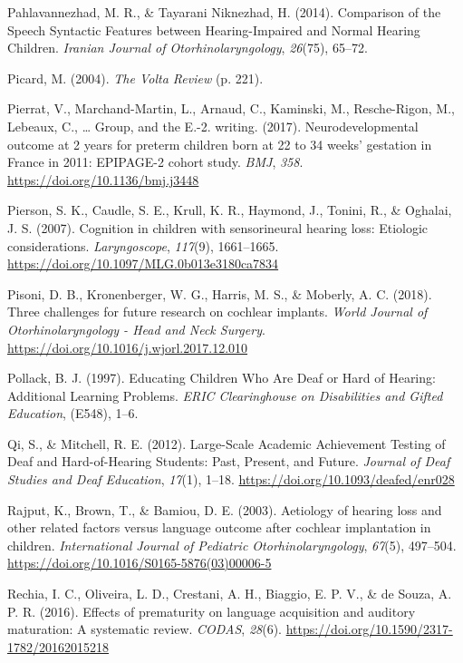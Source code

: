 \documentclass[english,man]{apa6}
\begin{document}
\leavevmode\hypertarget{ref-pahlavannezhad2014}{}%
Pahlavannezhad, M. R., \& Tayarani Niknezhad, H. (2014). Comparison of the Speech Syntactic Features between Hearing-Impaired and Normal Hearing Children. \emph{Iranian Journal of Otorhinolaryngology}, \emph{26}(75), 65--72.

\leavevmode\hypertarget{ref-picard2004}{}%
Picard, M. (2004). \emph{The Volta Review} (p. 221).

\leavevmode\hypertarget{ref-pierrat2017}{}%
Pierrat, V., Marchand-Martin, L., Arnaud, C., Kaminski, M., Resche-Rigon, M., Lebeaux, C., \ldots{} Group, and the E.-2. writing. (2017). Neurodevelopmental outcome at 2 years for preterm children born at 22 to 34 weeks' gestation in France in 2011: EPIPAGE-2 cohort study. \emph{BMJ}, \emph{358}. \url{https://doi.org/10.1136/bmj.j3448}

\leavevmode\hypertarget{ref-pierson2007}{}%
Pierson, S. K., Caudle, S. E., Krull, K. R., Haymond, J., Tonini, R., \& Oghalai, J. S. (2007). Cognition in children with sensorineural hearing loss: Etiologic considerations. \emph{Laryngoscope}, \emph{117}(9), 1661--1665. \url{https://doi.org/10.1097/MLG.0b013e3180ca7834}

\leavevmode\hypertarget{ref-pisoni2018}{}%
Pisoni, D. B., Kronenberger, W. G., Harris, M. S., \& Moberly, A. C. (2018). Three challenges for future research on cochlear implants. \emph{World Journal of Otorhinolaryngology - Head and Neck Surgery}. \url{https://doi.org/10.1016/j.wjorl.2017.12.010}

\leavevmode\hypertarget{ref-pollack1997}{}%
Pollack, B. J. (1997). Educating Children Who Are Deaf or Hard of Hearing: Additional Learning Problems. \emph{ERIC Clearinghouse on Disabilities and Gifted Education}, (E548), 1--6.

\leavevmode\hypertarget{ref-qi2012}{}%
Qi, S., \& Mitchell, R. E. (2012). Large-Scale Academic Achievement Testing of Deaf and Hard-of-Hearing Students: Past, Present, and Future. \emph{Journal of Deaf Studies and Deaf Education}, \emph{17}(1), 1--18. \url{https://doi.org/10.1093/deafed/enr028}

\leavevmode\hypertarget{ref-rajput2003}{}%
Rajput, K., Brown, T., \& Bamiou, D. E. (2003). Aetiology of hearing loss and other related factors versus language outcome after cochlear implantation in children. \emph{International Journal of Pediatric Otorhinolaryngology}, \emph{67}(5), 497--504. \url{https://doi.org/10.1016/S0165-5876(03)00006-5}

\leavevmode\hypertarget{ref-rechia2016}{}%
Rechia, I. C., Oliveira, L. D., Crestani, A. H., Biaggio, E. P. V., \& de Souza, A. P. R. (2016). Effects of prematurity on language acquisition and auditory maturation: A systematic review. \emph{CODAS}, \emph{28}(6). \url{https://doi.org/10.1590/2317-1782/20162015218}
\end{document}
